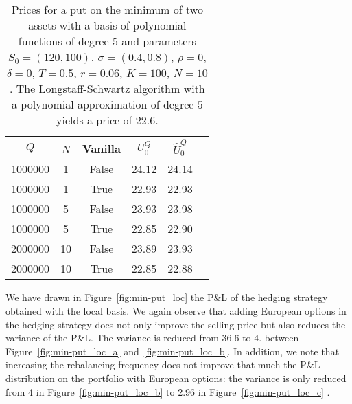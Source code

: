 \begin{table}[htbp!]
  \centering\begin{tabular}{cccccc}
    \hline
    $Q$ & $\bar{N}$  & Vanilla\phantom{$\Big|$} & $U_0^Q$ & $\hat{U}_0^Q$ \\
    \hline
    1000000 & 1 & False & 24.12 & 24.14 \\
    1000000 & 1 & True & 22.93 & 22.93 \\
    1000000 & 5 & False & 23.93 & 23.98 \\
    1000000 & 5 & True & 22.85 & 22.90 \\
    2000000 & 10 & False & 23.89 & 23.93 \\
    2000000 & 10 & True & 22.85 & 22.88 \\
    \hline
  \end{tabular}
  \caption{Prices for a put on the minimum of two assets with a basis of polynomial functions of degree $5$ and parameters $S_0=(120,100)$, $\sigma=(0.4,0.8)$,  $\rho=0$, $\delta=0$, $T=0.5$, $r=0.06$, $K=100$, $N=10$. The Longstaff-Schwartz algorithm with a polynomial approximation of degree $5$ yields a price of $22.6$.}\label{tab:min-put_pol}
\end{table}



We have drawn in Figure~\ref{fig:min-put_loc} the P\&L of the hedging strategy obtained with the local basis. We again observe that adding European options in the hedging strategy does not only improve the selling price but also reduces the variance of the P\&L. The variance is reduced from 36.6 to 4. between Figure~\ref{fig:min-put_loc_a} and~\ref{fig:min-put_loc_b}. In addition, we note that increasing the rebalancing frequency does not improve that much the P\&L distribution on the portfolio with European options: the variance is only reduced from 4 in Figure~\ref{fig:min-put_loc_b} to 2.96 in Figure~\ref{fig:min-put_loc_c} .

